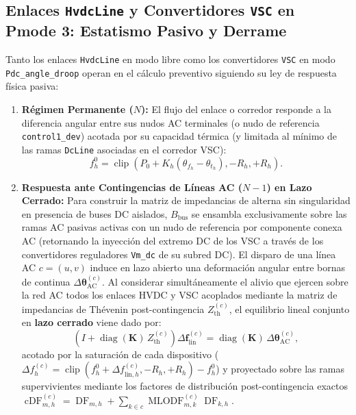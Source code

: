 \documentclass[11pt,a4paper]{article}
\begin{document}
\subsection{Enlaces \texttt{HvdcLine} y Convertidores \texttt{VSC} en Pmode 3: Estatismo Pasivo y Derrame}
Tanto los enlaces \texttt{HvdcLine} en modo libre como los convertidores \texttt{VSC} en modo \texttt{Pdc\_angle\_droop} operan en el cálculo preventivo siguiendo su ley de respuesta física pasiva:
\begin{enumerate}
    \item \textbf{Régimen Permanente ($N$):} El flujo del enlace o corredor responde a la diferencia angular entre sus nudos AC terminales (o nudo de referencia \texttt{control1\_dev}) acotada por su capacidad térmica (y limitada al mínimo de las ramas \texttt{DcLine} asociadas en el corredor VSC):
    \begin{equation}
    f_h^0 = \operatorname{clip}\left(P_0 + K_h(\theta_{f_h} - \theta_{t_h}), -R_h, +R_h\right).
    \end{equation}
    \item \textbf{Respuesta ante Contingencias de Líneas AC ($N-1$) en Lazo Cerrado:} Para construir la matriz de impedancias de alterna sin singularidad en presencia de buses DC aislados, $B_{\text{bus}}$ se ensambla exclusivamente sobre las ramas AC pasivas activas con un nudo de referencia por componente conexa AC (retornando la inyección del extremo DC de los VSC a través de los convertidores reguladores \texttt{Vm\_dc} de su subred DC). El disparo de una línea AC $c=(u, v)$ induce en lazo abierto una deformación angular entre bornas de continua $\Delta\bm{\theta}_{\text{AC}}^{(c)}$. Al considerar simultáneamente el alivio que ejercen sobre la red AC todos los enlaces HVDC y VSC acoplados mediante la matriz de impedancias de Thévenin post-contingencia $Z_{\text{th}}^{(c)}$, el equilibrio lineal conjunto en \textbf{lazo cerrado} viene dado por:
    \begin{equation}
    \left(I + \operatorname{diag}(\bm{K}) \, Z_{\text{th}}^{(c)}\right) \Delta\bm{f}_{\text{lin}}^{(c)} = \operatorname{diag}(\bm{K}) \, \Delta\bm{\theta}_{\text{AC}}^{(c)},
    \end{equation}
    acotado por la saturación de cada dispositivo ($\Delta f_h^{(c)} = \operatorname{clip}(f_h^0 + \Delta f_{\text{lin}, h}^{(c)}, -R_h, +R_h) - f_h^0$) y proyectado sobre las ramas supervivientes mediante los factores de distribución post-contingencia exactos $\operatorname{cDF}_{m, h}^{(c)} = \operatorname{DF}_{m, h} + \sum_{k \in c} \operatorname{MLODF}_{m, k}^{(c)} \operatorname{DF}_{k, h}$.

\end{enumerate}
\end{document}

